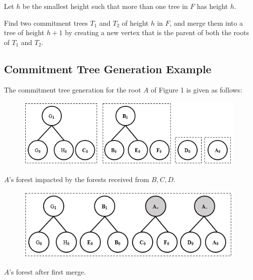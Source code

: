 \documentclass[%
  slidesonly,%
  semlayer%
  ]{seminar}                                  %
\begin{document}
\begin{slide}
      Let $h$ be the smallest height such that more than one tree in $F$ has height $h$.
      
      Find two commitment trees $T_{1}$ and $T_{2}$ of height $h$ in $F$, and merge them into a tree of height $h + 1$ by creating a new 
      vertex that is the parent of both the roots of $T_{1}$ and $T_{2}$.
      \vfill
      \clearpage
    \subsection*{Commitment Tree Generation Example}
      \vfill
      The commitment tree generation for the root $A$ of Figure 1 is given as follows:
      \begin{figure}
        \centering
        \includegraphics[scale = 0.4]{images/a-forest-shia.png}
      \end{figure}
      \begin{tiny}
      \begin{center}
        $A$'s forest impacted by the forests received from $B, C, D$.
      \end{center}
      \end{tiny}
      \begin{figure}
        \centering
        \includegraphics[scale = 0.4]{images/a-forest-first-merge-shia.png}
      \end{figure}
      \begin{tiny}
      \begin{center}
        $A$'s forest after first merge.
      \end{center}
      \end{tiny}
      \begin{figure}

\end{figure}
\end{slide}
\end{document}

